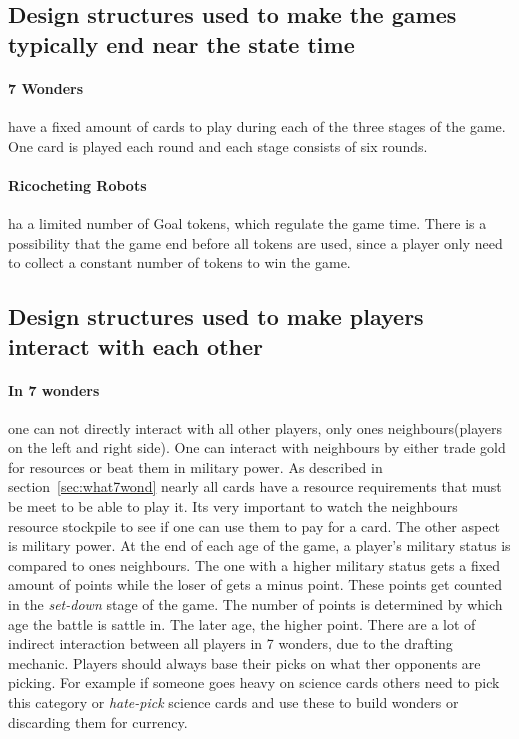 \documentclass[a4paper]{article}
\begin{document}
\subsection{Design structures used to make the games typically end near the state time}
\paragraph{7 Wonders} have a fixed amount of cards to play during each of the three stages of the game. One card is played each round and each stage consists of six rounds.

\paragraph{Ricocheting Robots} ha a limited number of Goal tokens, which regulate the game time. There is a possibility that the game end before all tokens are used, since a player only need to collect a constant number of tokens to win the game.

\subsection{Design structures used to make players interact with each other}

\paragraph{In 7 wonders} one can not directly interact with all other players, only ones neighbours(players on the left and right side). One can interact with neighbours by either trade gold for resources or beat them in military power. As described in section~\ref{sec:what7wond} nearly all cards have a resource requirements that must be meet to be able to play it. Its very important to watch the neighbours resource stockpile to see if one can use them to pay for a card. The other aspect is military power. At the end of each age of the game, a player's military status is compared to ones neighbours. The one with a higher military status gets a fixed amount of points while the loser of gets a minus point. These points get counted in the \textit{set-down} stage of the game. The number of points is determined by which age the battle is sattle in. The later age, the higher point. 
There are a lot of indirect interaction between all players in 7 wonders, due to the drafting mechanic. Players should always base their picks on what ther opponents are picking. For example if someone goes heavy on science cards others need to pick this category or \textit{hate-pick} science cards and use these to build wonders or discarding them for currency.
\end{document}
